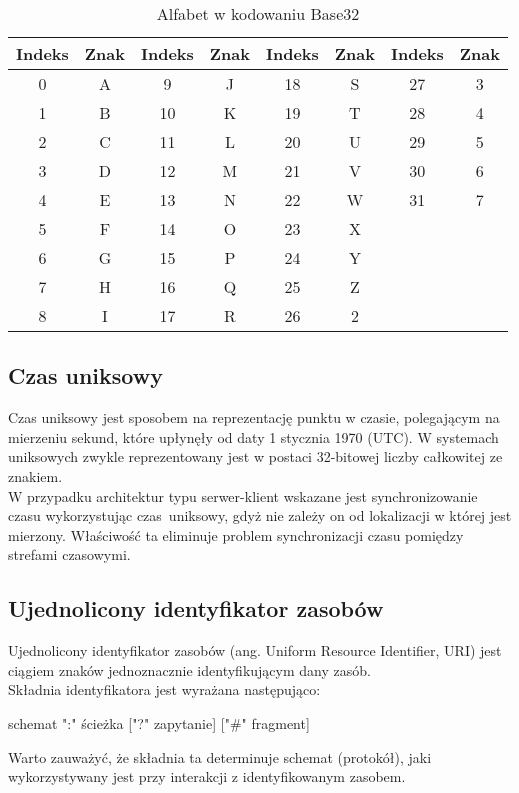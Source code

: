 \begin{table}[h!]
\centering
\caption{Alfabet w kodowaniu Base32}
\begin{tabular}{ |c c|c c|c c|c c| } 
 \hline
 Indeks & Znak & Indeks & Znak & Indeks & Znak & Indeks & Znak \\ 
 \hline
 0 & A & 9  & J & 18 & S & 27 & 3 \\ 
 1 & B & 10 & K & 19 & T & 28 & 4 \\ 
 2 & C & 11 & L & 20 & U & 29 & 5 \\ 
 3 & D & 12 & M & 21 & V & 30 & 6 \\ 
 4 & E & 13 & N & 22 & W & 31 & 7 \\ 
 5 & F & 14 & O & 23 & X &    &   \\ 
 6 & G & 15 & P & 24 & Y &    &   \\  
 7 & H & 16 & Q & 25 & Z &    &   \\ 
 8 & I & 17 & R & 26 & 2 &    &   \\ 
 \hline
\end{tabular}
\end{table}

\subsection{Czas uniksowy}
Czas uniksowy jest sposobem na reprezentację punktu w czasie, polegającym na mierzeniu sekund, które
upłynęły od daty 1 stycznia 1970 (UTC). W systemach uniksowych zwykle reprezentowany jest w postaci
32-bitowej liczby całkowitej ze znakiem. \\
W przypadku architektur typu serwer-klient wskazane jest synchronizowanie czasu wykorzystując czas~uniksowy,
gdyż nie zależy on od lokalizacji w której jest mierzony. Właściwość ta eliminuje problem synchronizacji 
czasu pomiędzy strefami czasowymi.

\subsection{Ujednolicony identyfikator zasobów}
Ujednolicony identyfikator zasobów (ang. Uniform Resource Identifier, URI) jest ciągiem znaków jednoznacznie identyfikującym dany zasób. \\
Składnia identyfikatora jest wyrażana następująco: \\
\centerline{schemat ":" ścieżka ["?" zapytanie] ["\#" fragment]} 
Warto zauważyć, że składnia ta determinuje schemat (protokół), jaki wykorzystywany jest przy interakcji z identyfikowanym zasobem. \\

